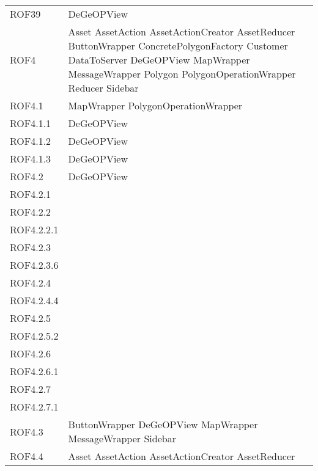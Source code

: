 \begin{longtable}{p{2.5cm}!{\VRule[1pt]}p{5cm}}
	ROF39 & DeGeOPView\\
	ROF4 & Asset \newline AssetAction \newline AssetActionCreator \newline AssetReducer \newline ButtonWrapper \newline ConcretePolygonFactory \newline Customer \newline DataToServer \newline DeGeOPView \newline MapWrapper \newline MessageWrapper \newline Polygon \newline PolygonOperationWrapper \newline Reducer \newline Sidebar\\
	ROF4.1 & MapWrapper \newline PolygonOperationWrapper\\
	ROF4.1.1 & DeGeOPView\\
	ROF4.1.2 & DeGeOPView\\
	ROF4.1.3 & DeGeOPView\\
	ROF4.2 & DeGeOPView\\
	ROF4.2.1 & \\
	ROF4.2.2 & \\
	ROF4.2.2.1 & \\
	ROF4.2.3 & \\
	ROF4.2.3.6 & \\
	ROF4.2.4 & \\
	ROF4.2.4.4 & \\
	ROF4.2.5 & \\
	ROF4.2.5.2 & \\
	ROF4.2.6 & \\
	ROF4.2.6.1 & \\
	ROF4.2.7 & \\
	ROF4.2.7.1 & \\
	ROF4.3 & ButtonWrapper \newline DeGeOPView \newline MapWrapper \newline MessageWrapper \newline Sidebar\\
	ROF4.4 & Asset \newline AssetAction \newline AssetActionCreator \newline AssetReducer\\

\end{longtable}
